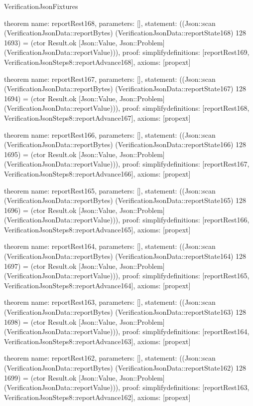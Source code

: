 \begin{lexlean}{VerificationJsonFixtures}
\begin{semanticmodule}
theorem{
  name: reportRest168,
  parameters: [],
  statement: ((Json::scan (VerificationJsonData::reportBytes) (VerificationJsonData::reportState168) 128 1693) = (ctor Result.ok [Json::Value, Json::Problem] (VerificationJsonData::reportValue))),
  proof: simplify{definitions: [reportRest169, VerificationJsonSteps8::reportAdvance168]},
  axioms: [propext]
}

theorem{
  name: reportRest167,
  parameters: [],
  statement: ((Json::scan (VerificationJsonData::reportBytes) (VerificationJsonData::reportState167) 128 1694) = (ctor Result.ok [Json::Value, Json::Problem] (VerificationJsonData::reportValue))),
  proof: simplify{definitions: [reportRest168, VerificationJsonSteps8::reportAdvance167]},
  axioms: [propext]
}

theorem{
  name: reportRest166,
  parameters: [],
  statement: ((Json::scan (VerificationJsonData::reportBytes) (VerificationJsonData::reportState166) 128 1695) = (ctor Result.ok [Json::Value, Json::Problem] (VerificationJsonData::reportValue))),
  proof: simplify{definitions: [reportRest167, VerificationJsonSteps8::reportAdvance166]},
  axioms: [propext]
}

theorem{
  name: reportRest165,
  parameters: [],
  statement: ((Json::scan (VerificationJsonData::reportBytes) (VerificationJsonData::reportState165) 128 1696) = (ctor Result.ok [Json::Value, Json::Problem] (VerificationJsonData::reportValue))),
  proof: simplify{definitions: [reportRest166, VerificationJsonSteps8::reportAdvance165]},
  axioms: [propext]
}

theorem{
  name: reportRest164,
  parameters: [],
  statement: ((Json::scan (VerificationJsonData::reportBytes) (VerificationJsonData::reportState164) 128 1697) = (ctor Result.ok [Json::Value, Json::Problem] (VerificationJsonData::reportValue))),
  proof: simplify{definitions: [reportRest165, VerificationJsonSteps8::reportAdvance164]},
  axioms: [propext]
}

theorem{
  name: reportRest163,
  parameters: [],
  statement: ((Json::scan (VerificationJsonData::reportBytes) (VerificationJsonData::reportState163) 128 1698) = (ctor Result.ok [Json::Value, Json::Problem] (VerificationJsonData::reportValue))),
  proof: simplify{definitions: [reportRest164, VerificationJsonSteps8::reportAdvance163]},
  axioms: [propext]
}

theorem{
  name: reportRest162,
  parameters: [],
  statement: ((Json::scan (VerificationJsonData::reportBytes) (VerificationJsonData::reportState162) 128 1699) = (ctor Result.ok [Json::Value, Json::Problem] (VerificationJsonData::reportValue))),
  proof: simplify{definitions: [reportRest163, VerificationJsonSteps8::reportAdvance162]},
  axioms: [propext]
}


\end{semanticmodule}
\end{lexlean}
